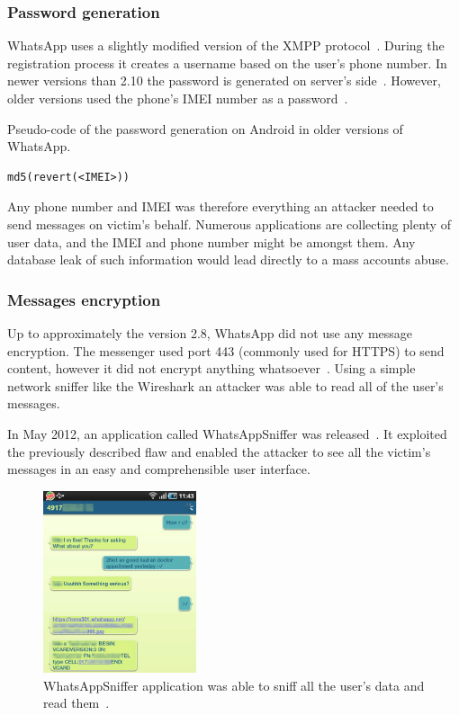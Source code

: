 \documentclass[thesis=M,english]{FITthesis}[2012/10/20]
\begin{document}
\subsubsection{Password generation}

WhatsApp uses a slightly modified version of the XMPP protocol~\cite{whatsapp-xmpp}. During the registration process it creates a username based on the user's phone number. In newer versions than 2.10 the password is generated on server's side~\cite{whatsapp-imei}. However, older versions used the phone's IMEI number as a password~\cite{whatsapp-imei, whatsapp-imei2}.

\begin{listing}[htb]
\caption{Pseudo-code of the password generation on Android in older versions of WhatsApp.}
\begin{verbatim}
md5(revert(<IMEI>))
\end{verbatim}
\label{lst:status-whatsapp-password}
\end{listing}


Any phone number and IMEI was therefore everything an attacker needed to send messages on victim's behalf. Numerous applications are collecting plenty of user data, and the IMEI and phone number might be amongst them. Any database leak of such information would lead directly to a mass accounts abuse.

\subsubsection{Messages encryption}

Up to approximately the version 2.8, WhatsApp did not use any message encryption. The messenger used port 443 (commonly used for HTTPS) to send content, however it did not encrypt anything whatsoever~\cite{whatsapp-plaintext}. Using a simple network sniffer like the Wireshark an attacker was able to read all of the user's messages.

In May 2012, an application called WhatsAppSniffer was released~\cite{whatsapp-sniffer, whatsapp-sniffer2}. It exploited the previously described flaw and enabled the attacker to see all the victim's messages in an easy and comprehensible user interface.

\begin{figure}[htb]
	\centering
	\includegraphics[width=0.4\textwidth]{whatsapp-sniffer.png}
	\caption[WhatsAppSniffer]{WhatsAppSniffer application was able to sniff all the user's data and read them~\cite{whatsapp-sniffer2}.}
	\label{img:whatsapp_sniffer}
\end{figure}
\end{document}
